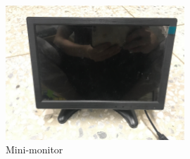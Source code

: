 \documentclass[12pt, a4paper, onside]{article}
\begin{document}
\begin{figure}[h]
  \centering
  \includegraphics[width=0.6\textwidth]{img/8_pic_minimonitor}
  \caption{Mini-monitor}
\end{figure}

\clearpage
\end{document}
